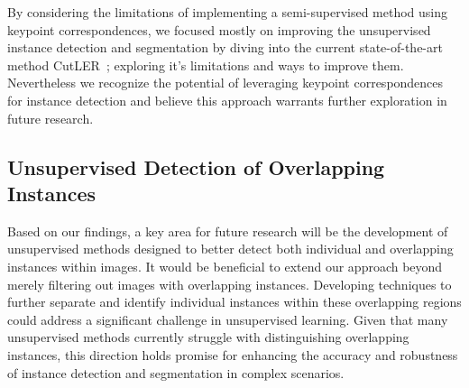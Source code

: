 By considering the limitations of implementing a semi-supervised method using keypoint correspondences, we focused mostly on improving the unsupervised instance detection and segmentation by diving into the current state-of-the-art method CutLER~\cite{wang2023cut}; exploring it's limitations and ways to improve them. Nevertheless we recognize the potential of leveraging keypoint correspondences for instance detection and believe this approach warrants further exploration in future research.



\subsection{Unsupervised Detection of Overlapping Instances}
Based on our findings, a key area for future research will be the development of unsupervised methods designed to better detect both individual and overlapping instances within images. It would be beneficial to extend our approach beyond merely filtering out images with overlapping instances. Developing techniques to further separate and identify individual instances within these overlapping regions could address a significant challenge in unsupervised learning. Given that many unsupervised methods currently struggle with distinguishing overlapping instances, this direction holds promise for enhancing the accuracy and robustness of instance detection and segmentation in complex scenarios.


